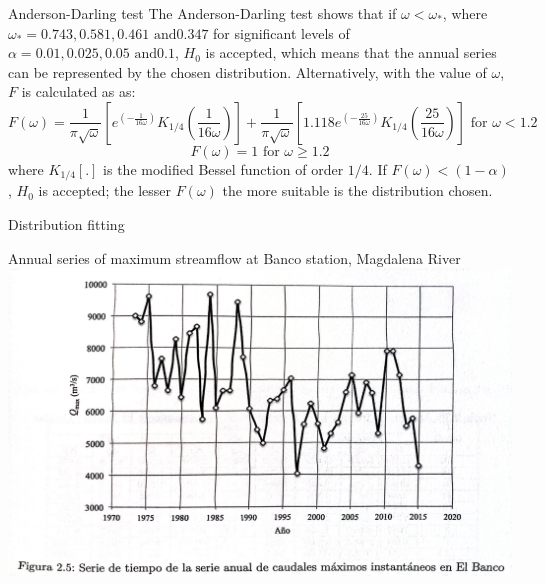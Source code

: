 \documentclass[8pt]{beamer}
\renewcommand{\emph}[1]{\textcolor{myorange}{#1}}
\begin{document}
\begin{frame}{Anderson-Darling test}
The \emph{Anderson-Darling test} shows that if $\omega < \omega_*$, where $\omega_* = 0.743, 0.581, 0.461 \text{ and} 0.347$ for significant levels of $\alpha = 0.01, 0.025, 0.05 \text{ and} 0.1$, $H_0$ is accepted, which means that the annual series can be represented by the chosen distribution. Alternatively, with the value of $\omega$, $F$ is calculated as as:
\[
    F(\omega) = \frac{1}{\pi \sqrt{\omega}} \left[ e^{\left(-\frac{1}{16\omega} \right)} K_{1/4}\left(\frac{1}{16\omega} \right) \right] + \frac{1}{\pi \sqrt{\omega}} \left[ 1.118 e^{\left(-\frac{25}{16\omega} \right)} K_{1/4} \left(\frac{25}{16\omega} \right) \right] \text{ for } \omega < 1.2 
        \]
        \[
            F(\omega) = 1 \text{ for } \omega \geq 1.2
        \]
        where $K_{1/4} [.]$ is the modified \emph{Bessel function} of order $1/4$. If $F(\omega) < (1-\alpha)$, $H_0$ is accepted; the lesser $F(\omega)$ the more suitable is the distribution chosen. 
\end{frame}

\begin{frame}{Distribution fitting}
  \begin{exampleblock}{Annual series of maximum streamflow at Banco station, Magdalena River} %
\centering
\includegraphics[width=1.0\linewidth]{fiM25.jpg}  %
 \end{exampleblock}
\end{frame}
\end{document}
